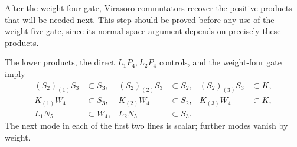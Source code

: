 After the weight-four gate, Virasoro commutators recover the positive
products that will be needed next. This step should be proved before
any use of the weight-five gate, since its normal-space argument
depends on precisely these products.

\begin{lemma}
\label{lem:c-positive-bootstrap}
The lower products, the direct $L_1P_4,L_2P_4$ controls, and the
weight-four gate imply
\begin{align*}
 (S_2)_{(1)}S_3&\subset S_3,&
 (S_2)_{(2)}S_3&\subset S_2,&
 (S_2)_{(3)}S_3&\subset K,\\
 K_{(1)}W_4&\subset S_3,&
 K_{(2)}W_4&\subset S_2,&
 K_{(3)}W_4&\subset K,\\
 L_1N_5&\subset W_4,&
 L_2N_5&\subset S_3.&&
\end{align*}
The next mode in each of the first two lines is scalar; further
modes vanish by weight.
\end{lemma}
